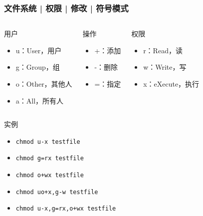 \begin{frame}[fragile]
  \frametitle{文件系统 | 权限 | 修改 | \alert{符号模式}}
  \begin{columns}
    \begin{block}{用户}
      \begin{itemize}
        \item u：User，用户
        \item g：Group，组
        \item o：Other，其他人
        \item a：All，所有人
      \end{itemize}
    \end{block}
    \pause
    \begin{block}{操作}
      \begin{itemize}
        \item +：添加
        \item -：删除
        \item =：指定
      \end{itemize}
    \end{block}
    \pause
    \begin{block}{权限}
      \begin{itemize}
        \item r：Read，读
        \item w：Write，写
        \item x：eXecute，执行
      \end{itemize}
    \end{block}
  \end{columns}
  \pause
  \begin{block}{实例}
    \begin{itemize}
      \item \verb|chmod u-x testfile|
      \item \verb|chmod g=rx testfile|
      \item \verb|chmod o+wx testfile|
      \item \verb|chmod uo+x,g-w testfile|
      \item \verb|chmod u-x,g=rx,o+wx testfile|
    \end{itemize}
  \end{block}
\end{frame}

